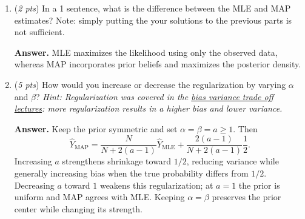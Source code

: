 \documentclass[11pt]{article}
\begin{document}
\begin{enumerate}[label=(\alph*)]
    \item (\textit{2 pts}) In a 1 sentence, what is the difference between the MLE and MAP estimates? Note: simply putting the your solutions to the previous parts is not sufficient. 

    \textbf{Answer.} MLE maximizes the likelihood using only the observed data,
    whereas MAP incorporates prior beliefs and maximizes the posterior density.
    
    \item  (\textit{5 pts}) How would you increase or decrease the regularization by varying $\alpha$ and $\beta$? \textit{Hint: Regularization was covered in the \hyperlink{https://drive.google.com/file/d/1s2yjJX2L93fuT9Zc96BRJ92H-D7MMrvg/view}{bias variance trade off lectures}: more regularization results in a higher bias and lower variance. }

    \textbf{Answer.} Keep the prior symmetric and set $\alpha=\beta=a\geq1$.
    Then
    \[
        \hat Y_{\mathrm{MAP}}=
        \frac{N}{N+2(a-1)}\hat Y_{\mathrm{MLE}}
        +\frac{2(a-1)}{N+2(a-1)}\frac12.
    \]
    Increasing $a$ strengthens shrinkage toward $1/2$, reducing variance
    while generally increasing bias when the true probability differs from
    $1/2$. Decreasing $a$ toward $1$ weakens this regularization; at $a=1$
    the prior is uniform and MAP agrees with MLE. Keeping $\alpha=\beta$
    preserves the prior center while changing its strength.
    
  
\end{enumerate}
\end{document}
